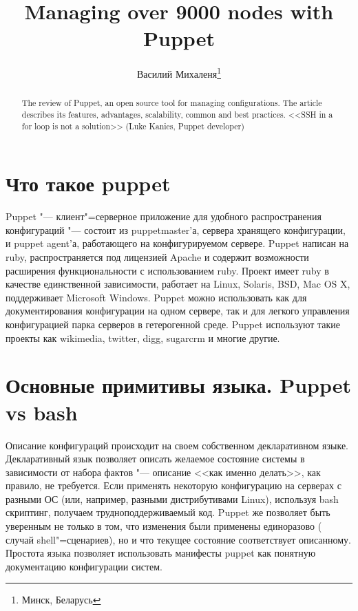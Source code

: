 \documentclass[10pt, a5paper]{article}
\begin{document}
\title{Managing over 9000 nodes with Puppet}%

\author{Василий Михаленя\footnote{Минск, Беларусь}}
\maketitle

\begin{abstract}
The review of Puppet, an open source tool for managing configurations. The article describes its features, advantages, scalability, common and best practices. <<SSH in a for loop is not a solution>> (Luke Kanies, Puppet developer)
\end{abstract}

\section*{Что такое puppet}

Puppet "--- клиент"=серверное приложение для удобного распространения конфигураций "--- состоит из puppetmaster'а, сервера хранящего конфигурации, и puppet agent'а, работающего на конфигурируемом сервере. Puppet написан на ruby, распространяется под лицензией Apache и содержит возможности расширения функциональности с использованием ruby. Проект имеет ruby в качестве единственной зависимости, работает на Linux, Solaris, BSD, Mac OS X, поддерживает Microsoft Windows. Puppet можно использовать как для документирования конфигурации на одном сервере, так и для легкого управления конфигурацией парка серверов в гетерогенной среде. Puppet используют такие проекты как wikimedia, twitter, digg, sugarcrm и многие другие.

\section*{Основные примитивы языка. Puppet vs bash}

Описание конфигураций происходит на своем собственном декларативном языке. Декларативный язык позволяет описать желаемое состояние системы в зависимости от набора фактов "--- описание <<как именно делать>>, как правило, не требуется. Если применять некоторую конфигурацию на серверах с разными ОС (или, например, разными дистрибутивами Linux), используя bash скриптинг, получаем трудноподдерживаемый код. Puppet же позволяет быть уверенным не только в том, что изменения были применены единоразово ( случай shell"=сценариев), но и что текущее состояние соответствует описанному. Простота языка позволяет использовать манифесты puppet как понятную документацию конфигурации систем.
\end{document}
